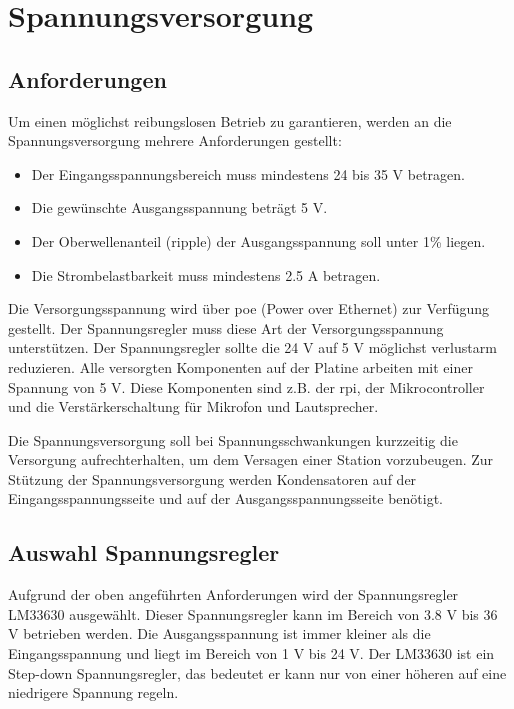 \section{Spannungsversorgung}
\subsection{Anforderungen}
Um einen möglichst reibungslosen Betrieb zu garantieren, werden an die Spannungsversorgung mehrere Anforderungen gestellt:
\begin{itemize}
	\item Der Eingangsspannungsbereich muss mindestens 24 bis 35 V betragen.
	\item Die gewünschte Ausgangsspannung beträgt 5 V.
	\item Der Oberwellenanteil (ripple) der Ausgangsspannung soll unter 1\% liegen. 
	\item Die Strombelastbarkeit muss mindestens 2.5 A betragen.
\end{itemize}
Die Versorgungsspannung wird über  \ac{poe} (Power over Ethernet) zur Verfügung gestellt.
Der Spannungsregler muss diese Art der Versorgungsspannung unterstützen.
Der Spannungsregler sollte die 24 V auf 5 V möglichst verlustarm reduzieren.
Alle versorgten Komponenten auf der Platine arbeiten mit einer Spannung von 5 V.
Diese Komponenten sind z.B. der \ac{rpi}, der Mikrocontroller und die Verstärkerschaltung für Mikrofon und Lautsprecher.\par

Die Spannungsversorgung soll bei Spannungsschwankungen kurzzeitig die Versorgung aufrechterhalten, um dem Versagen einer Station vorzubeugen.
Zur Stützung der Spannungsversorgung werden Kondensatoren auf der Eingangsspannungsseite und auf der Ausgangsspannungsseite benötigt.

\subsection{Auswahl Spannungsregler}
Aufgrund der oben angeführten Anforderungen wird der Spannungsregler LM33630 ausgewählt.
Dieser Spannungsregler kann im Bereich von 3.8 V bis 36 V betrieben werden.
Die Ausgangsspannung ist immer kleiner als die Eingangsspannung und liegt im Bereich von 1 V bis 24 V.
Der LM33630 ist ein Step-down Spannungsregler, das bedeutet er kann nur von einer höheren auf eine niedrigere Spannung regeln.\par

